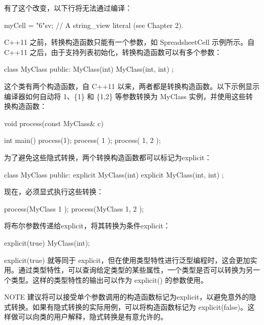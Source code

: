 有了这个改变，以下行将无法通过编译：

\begin{cpp}
myCell = "6"sv; // A string_view literal (see Chapter 2).
\end{cpp}

C++11 之前，转换构造函数只能有一个参数，如 SpreadsheetCell 示例所示。自 C++11 之后，由于支持列表初始化，转换构造函数可以有多个参数：

\begin{cpp}
class MyClass
{
    public:
        MyClass(int) { }
        MyClass(int, int) { }
};
\end{cpp}

这个类有两个构造函数，自 C++11 以来，两者都是转换构造函数。以下示例显示编译器如何自动将 1、\{1\} 和 \{1,2\} 等参数转换为 MyClass 实例，并使用这些转换构造函数：

\begin{cpp}
void process(const MyClass& c) { }

int main()
{
    process(1);
    process({ 1 });
    process({ 1, 2 });
}
\end{cpp}

为了避免这些隐式转换，两个转换构造函数都可以标记为explicit：

\begin{cpp}
class MyClass
{
    public:
    explicit MyClass(int) { }
    explicit MyClass(int, int) { }
};
\end{cpp}

现在，必须显式执行这些转换：

\begin{cpp}
process(MyClass{ 1 });
process(MyClass{ 1, 2 });
\end{cpp}

将布尔参数传递给explicit，将其转换为条件explicit：

\begin{cpp}
explicit(true) MyClass(int);
\end{cpp}

explicit(true) 就等同于 explicit，但在使用类型特性进行泛型编程时，这会更加实用。通过类型特性，可以查询给定类型的某些属性，一个类型是否可以转换为另一个类型。这样的类型特性的输出可以作为 explicit() 的参数使用。

\begin{myNotic}{NOTE}
建议将可以接受单个参数调用的构造函数标记为explicit，以避免意外的隐式转换。如果有隐式转换的实际用例，可以将构造函数标记为 explicit(false)。这样做可以向类的用户解释，隐式转换是有意允许的。
\end{myNotic}


